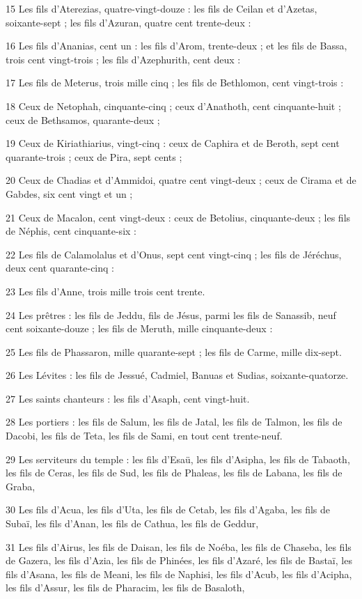 \par 15 Les fils d'Aterezias, quatre-vingt-douze : les fils de Ceilan et d'Azetas, soixante-sept ; les fils d'Azuran, quatre cent trente-deux :
\par 16 Les fils d'Ananias, cent un : les fils d'Arom, trente-deux ; et les fils de Bassa, trois cent vingt-trois ; les fils d'Azephurith, cent deux :
\par 17 Les fils de Meterus, trois mille cinq ; les fils de Bethlomon, cent vingt-trois :
\par 18 Ceux de Netophah, cinquante-cinq ; ceux d'Anathoth, cent cinquante-huit ; ceux de Bethsamos, quarante-deux ;
\par 19 Ceux de Kiriathiarius, vingt-cinq : ceux de Caphira et de Beroth, sept cent quarante-trois ; ceux de Pira, sept cents ;
\par 20 Ceux de Chadias et d'Ammidoi, quatre cent vingt-deux ; ceux de Cirama et de Gabdes, six cent vingt et un ;
\par 21 Ceux de Macalon, cent vingt-deux : ceux de Betolius, cinquante-deux ; les fils de Néphis, cent cinquante-six :
\par 22 Les fils de Calamolalus et d'Onus, sept cent vingt-cinq ; les fils de Jéréchus, deux cent quarante-cinq :
\par 23 Les fils d'Anne, trois mille trois cent trente.
\par 24 Les prêtres : les fils de Jeddu, fils de Jésus, parmi les fils de Sanassib, neuf cent soixante-douze ; les fils de Meruth, mille cinquante-deux :
\par 25 Les fils de Phassaron, mille quarante-sept ; les fils de Carme, mille dix-sept.
\par 26 Les Lévites : les fils de Jessué, Cadmiel, Banuas et Sudias, soixante-quatorze.
\par 27 Les saints chanteurs : les fils d'Asaph, cent vingt-huit.
\par 28 Les portiers : les fils de Salum, les fils de Jatal, les fils de Talmon, les fils de Dacobi, les fils de Teta, les fils de Sami, en tout cent trente-neuf.
\par 29 Les serviteurs du temple : les fils d'Esaü, les fils d'Asipha, les fils de Tabaoth, les fils de Ceras, les fils de Sud, les fils de Phaleas, les fils de Labana, les fils de Graba,
\par 30 Les fils d'Acua, les fils d'Uta, les fils de Cetab, les fils d'Agaba, les fils de Subaï, les fils d'Anan, les fils de Cathua, les fils de Geddur,
\par 31 Les fils d'Airus, les fils de Daisan, les fils de Noéba, les fils de Chaseba, les fils de Gazera, les fils d'Azia, les fils de Phinées, les fils d'Azaré, les fils de Bastaï, les fils d'Asana, les fils de Meani, les fils de Naphisi, les fils d'Acub, les fils d'Acipha, les fils d'Assur, les fils de Pharacim, les fils de Basaloth,
